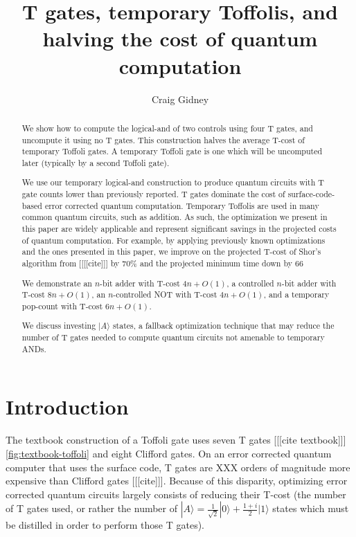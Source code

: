 \documentclass[twocolumn,longbibliography]{quantumarticle-customized}
\title{T gates, temporary Toffolis, and halving the cost of quantum computation}
\author{Craig Gidney}
\affiliation{Google, Santa Barbara, CA 93117, USA}
\begin{document}
\maketitle

\begin{abstract}
We show how to compute the logical-and of two controls using four T gates, and uncompute it using no T gates.
This construction halves the average T-cost of temporary Toffoli gates.
A temporary Toffoli gate is one which will be uncomputed later (typically by a second Toffoli gate).

We use our temporary logical-and construction to produce quantum circuits with T gate counts lower than previously reported.
T gates dominate the cost of surface-code-based error corrected quantum computation.
Temporary Toffolis are used in many common quantum circuits, such as addition.
As such, the optimization we present in this paper are widely applicable and represent significant savings in the projected costs of quantum computation.
For example, by applying previously known optimizations and the ones presented in this paper, we improve on the projected T-cost of Shor's algorithm from [[[[cite]]] by 70\% and the projected minimum time down by 66%

We demonstrate an $n$-bit adder with T-cost $4n + O(1)$, a controlled $n$-bit adder with T-cost $8n + O(1)$, an $n$-controlled NOT with T-cost $4n + O(1)$, and a temporary pop-count with T-cost $6n + O(1)$.

We discuss investing $|A\rangle$ states, a fallback optimization technique that may reduce the number of T gates needed to compute quantum circuits not amenable to temporary ANDs.
\end{abstract}

\section{Introduction} \label{sec:introduction}

The textbook construction of a Toffoli gate uses seven T gates [[[cite textbook]]] \autoref{fig:textbook-toffoli} and eight Clifford gates.
On an error corrected quantum computer that uses the surface code, T gates are XXX orders of magnitude more expensive than Clifford gates [[[cite]]].
Because of this disparity, optimizing error corrected quantum circuits largely consists of reducing their T-cost (the number of T gates used, or rather the number of $|A\rangle = \frac{1}{\sqrt{2}} |0\rangle + \frac{1+i}{2} |1\rangle$ states which must be distilled in order to perform those T gates).
\end{document}
